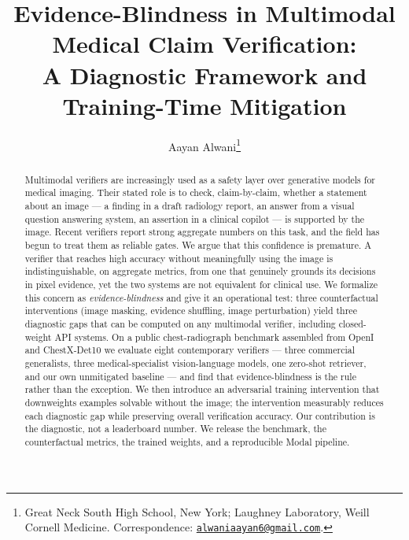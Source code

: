 \documentclass[11pt]{article}
\title{\vspace{-0.3in}Evidence-Blindness in Multimodal Medical Claim Verification:\\ A Diagnostic Framework and Training-Time Mitigation}
\author{Aayan Alwani\thanks{Great Neck South High School, New York; Laughney Laboratory, Weill Cornell Medicine. Correspondence: \href{mailto:alwaniaayan6@gmail.com}{\texttt{alwaniaayan6@gmail.com}}.}}
\date{}
\begin{document}
\maketitle

\vspace{-0.35in}
\begin{center}
\end{center}
\vspace{0.1in}

\begin{abstract}
Multimodal verifiers are increasingly used as a safety layer over generative models for medical imaging. Their stated role is to check, claim-by-claim, whether a statement about an image --- a finding in a draft radiology report, an answer from a visual question answering system, an assertion in a clinical copilot --- is supported by the image. Recent verifiers report strong aggregate numbers on this task, and the field has begun to treat them as reliable gates. We argue that this confidence is premature. A verifier that reaches high accuracy without meaningfully using the image is indistinguishable, on aggregate metrics, from one that genuinely grounds its decisions in pixel evidence, yet the two systems are not equivalent for clinical use. We formalize this concern as \emph{evidence-blindness} and give it an operational test: three counterfactual interventions (image masking, evidence shuffling, image perturbation) yield three diagnostic gaps that can be computed on any multimodal verifier, including closed-weight API systems. On a public chest-radiograph benchmark assembled from OpenI and ChestX-Det10 we evaluate eight contemporary verifiers --- three commercial generalists, three medical-specialist vision-language models, one zero-shot retriever, and our own unmitigated baseline --- and find that evidence-blindness is the rule rather than the exception. We then introduce an adversarial training intervention that downweights examples solvable without the image; the intervention measurably reduces each diagnostic gap while preserving overall verification accuracy. Our contribution is the diagnostic, not a leaderboard number. We release the benchmark, the counterfactual metrics, the trained weights, and a reproducible Modal pipeline.
\end{abstract}
\end{document}
